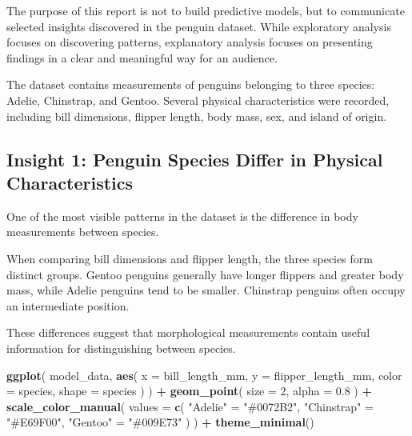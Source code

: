 \documentclass[
]{article}
\newenvironment{Shaded}{\begin{snugshade}}{\end{snugshade}}
\newcommand{\AttributeTok}[1]{\textcolor[rgb]{0.13,0.29,0.53}{#1}}
\newcommand{\DecValTok}[1]{\textcolor[rgb]{0.00,0.00,0.81}{#1}}
\newcommand{\FloatTok}[1]{\textcolor[rgb]{0.00,0.00,0.81}{#1}}
\newcommand{\FunctionTok}[1]{\textcolor[rgb]{0.13,0.29,0.53}{\textbf{#1}}}
\newcommand{\NormalTok}[1]{#1}
\newcommand{\OtherTok}[1]{\textcolor[rgb]{0.56,0.35,0.01}{#1}}
\newcommand{\SpecialCharTok}[1]{\textcolor[rgb]{0.81,0.36,0.00}{\textbf{#1}}}
\newcommand{\StringTok}[1]{\textcolor[rgb]{0.31,0.60,0.02}{#1}}
\begin{document}
The purpose of this report is not to build predictive models, but to
communicate selected insights discovered in the penguin dataset. While
exploratory analysis focuses on discovering patterns, explanatory
analysis focuses on presenting findings in a clear and meaningful way
for an audience.

The dataset contains measurements of penguins belonging to three
species: Adelie, Chinstrap, and Gentoo. Several physical characteristics
were recorded, including bill dimensions, flipper length, body mass,
sex, and island of origin.

\subsection{Insight 1: Penguin Species Differ in Physical
Characteristics}\label{insight-1-penguin-species-differ-in-physical-characteristics}

One of the most visible patterns in the dataset is the difference in
body measurements between species.

When comparing bill dimensions and flipper length, the three species
form distinct groups. Gentoo penguins generally have longer flippers and
greater body mass, while Adelie penguins tend to be smaller. Chinstrap
penguins often occupy an intermediate position.

These differences suggest that morphological measurements contain useful
information for distinguishing between species.

\begin{Shaded}
\begin{Highlighting}[]
\FunctionTok{ggplot}\NormalTok{(}
\NormalTok{  model\_data,}
  \FunctionTok{aes}\NormalTok{(}
    \AttributeTok{x =}\NormalTok{ bill\_length\_mm,}
    \AttributeTok{y =}\NormalTok{ flipper\_length\_mm,}
    \AttributeTok{color =}\NormalTok{ species,}
    \AttributeTok{shape =}\NormalTok{ species}
\NormalTok{  )}
\NormalTok{) }\SpecialCharTok{+}
  \FunctionTok{geom\_point}\NormalTok{(}
    \AttributeTok{size =} \DecValTok{2}\NormalTok{,}
    \AttributeTok{alpha =} \FloatTok{0.8}
\NormalTok{  ) }\SpecialCharTok{+}
  \FunctionTok{scale\_color\_manual}\NormalTok{(}
    \AttributeTok{values =} \FunctionTok{c}\NormalTok{(}
      \StringTok{"Adelie"} \OtherTok{=} \StringTok{"\#0072B2"}\NormalTok{,}
      \StringTok{"Chinstrap"} \OtherTok{=} \StringTok{"\#E69F00"}\NormalTok{,}
      \StringTok{"Gentoo"} \OtherTok{=} \StringTok{"\#009E73"}
\NormalTok{    )}
\NormalTok{  ) }\SpecialCharTok{+}
  \FunctionTok{theme\_minimal}\NormalTok{()}
\end{Highlighting}
\end{Shaded}
\end{document}
